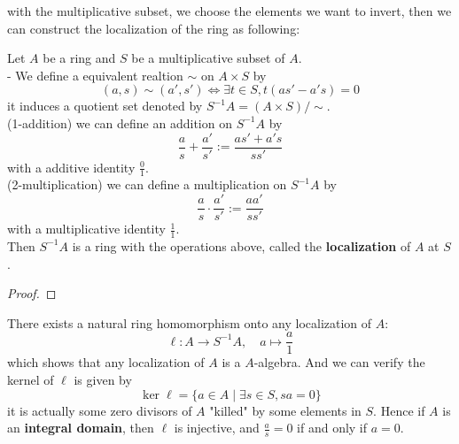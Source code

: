 \documentclass[12pt,a4paper]{article}
\begin{document}
with the multiplicative subset, we choose the elements we want to invert, then we can construct the localization of the ring as following:
\begin{lemma}
    Let \(A\) be a ring and \(S\) be a multiplicative subset of \(A\).\\

    - We define a equivalent realtion \(\sim\) on \(A \times S\) by
    \[(a,s)\sim (a',s') \iff \exists t \in S, t(as'-a's) = 0\]
    it induces a quotient set denoted by \(S^{-1}A = (A \times S)/\sim\).\\

    (1-addition) we can define an addition on \(S^{-1}A\) by
    \[\frac{a}{s} + \frac{a'}{s'} := \frac{as' + a's}{ss'}\]
    with a additive identity \(\frac{0}{1}\).\\

    (2-multiplication) we can define a multiplication on \(S^{-1}A\) by
    \[\frac{a}{s} \cdot \frac{a'}{s'} := \frac{aa'}{ss'}\]
    with a multiplicative identity \(\frac{1}{1}\).\\

    Then \(S^{-1}A\) is a ring with the operations above, called the \textbf{localization} of \(A\) at \(S\).\\

\end{lemma}
\begin{proof}
    
\end{proof}

\begin{remark}
    There exists a natural ring homomorphism onto any localization of \(A\):
    \[\ell: A \to S^{-1}A, \quad a \mapsto \frac{a}{1}\]
    which shows that any localization of \(A\) is a \(A\)-algebra. And we can verify the kernel of \(\ell\) is given by
    \[\ker \ell = \{a \in A \mid \exists s \in S, sa = 0\}\]
    it is actually some zero divisors of \(A\) "killed" by some elements in \(S\). Hence if \(A\) is an \textbf{integral domain}, then \(\ell\) is injective, and \(\frac{a}{s} = 0\) if and only if \(a = 0\).
\end{remark}
\end{document}
